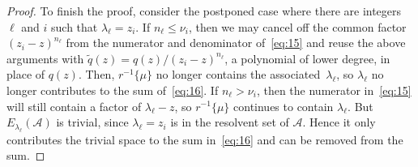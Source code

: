 \documentclass[12pt, oneside, reqno]{amsart}
\theoremstyle{remark}
\newcommand{\Ac}{\mathcal{A}}
\begin{document}
\begin{proof}
  
  To finish the proof, consider the postponed case where there
  are integers 
  $\ell$ and $i$ such that $\lambda_\ell = z_i$. If $n_\ell \le  \nu_i$, then we may 
  cancel off the common factor $(z_i - z)^{n_\ell}$
  from the numerator and denominator of~\eqref{eq:15} and reuse the above arguments with
  $\tilde q(z) = q(z)/ (z_i - z)^{n_\ell}$, a polynomial of lower degree,
  in place of $q(z)$.
  Then,   $r^{-1} \{ \mu \}$ no longer contains the associated~$\lambda_\ell$,
  so  $\lambda_\ell$ no longer 
  contributes to the sum of~\eqref{eq:16}. If $n_\ell>\nu_i$, then the
  numerator in~\eqref{eq:15} will still contain a factor of
  $\lambda_\ell -z$, so $r^{-1}\{ \mu\}$ continues to contain
  $\lambda_\ell$. But $E_{\lambda_\ell}(\Ac)$ is trivial, since
  $\lambda_\ell=z_i$ is in the resolvent
  set of $\Ac$. Hence it only contributes the trivial space to the sum
  in~\eqref{eq:16} and can be removed from the sum.
\end{proof}
\end{document}
